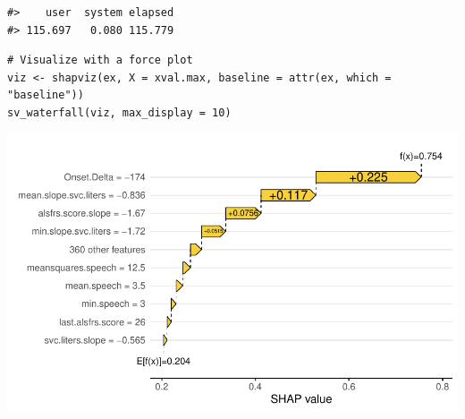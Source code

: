 \begin{verbatim}
#>    user  system elapsed 
#> 115.697   0.080 115.779
\end{verbatim}

\begin{verbatim}
# Visualize with a force plot
viz <- shapviz(ex, X = xval.max, baseline = attr(ex, which = "baseline"))
sv_waterfall(viz, max_display = 10)
\end{verbatim}

\includegraphics[width=1\linewidth]{greenwell_files/figure-latex/als-ngboost-fastshap-1}

